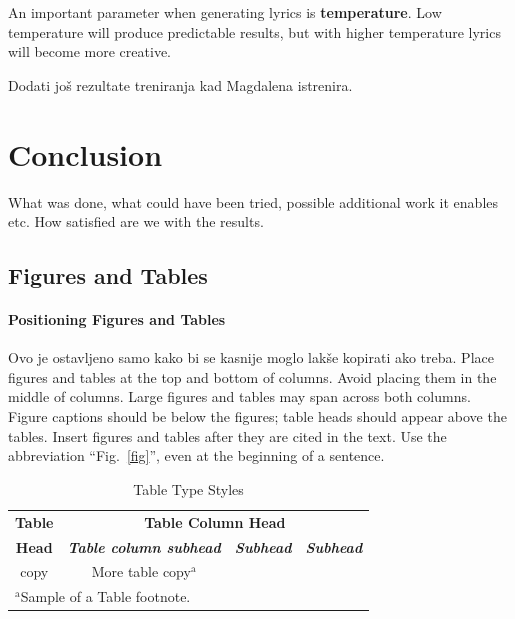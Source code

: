 \documentclass[conference]{IEEEtran}
\begin{document}
An important parameter when generating lyrics is \textbf{temperature}. Low temperature will produce predictable results, but with 
higher temperature lyrics will become more creative.

Dodati još rezultate treniranja kad Magdalena istrenira.

\section{Conclusion}
What was done, what could have been tried, possible additional work it enables
etc. How satisfied are we with the results.

 


\subsection{Figures and Tables}
\paragraph{Positioning Figures and Tables} 
Ovo je ostavljeno samo kako bi se kasnije moglo lakše kopirati ako treba.
Place figures and tables at the top and 
bottom of columns. Avoid placing them in the middle of columns. Large 
figures and tables may span across both columns. Figure captions should be 
below the figures; table heads should appear above the tables. Insert 
figures and tables after they are cited in the text. Use the abbreviation 
``Fig.~\ref{fig}'', even at the beginning of a sentence.

\begin{table}[htbp]
\caption{Table Type Styles}
\begin{center}
\begin{tabular}{|c|c|c|c|}
\hline
\textbf{Table}&\multicolumn{3}{|c|}{\textbf{Table Column Head}} \\
\cline{2-4} 
\textbf{Head} & \textbf{\textit{Table column subhead}}& \textbf{\textit{Subhead}}& \textbf{\textit{Subhead}} \\
\hline
copy& More table copy$^{\mathrm{a}}$& &  \\
\hline
\multicolumn{4}{l}{$^{\mathrm{a}}$Sample of a Table footnote.}
\end{tabular}
\label{tab1}
\end{center}
\end{table}
\end{document}
